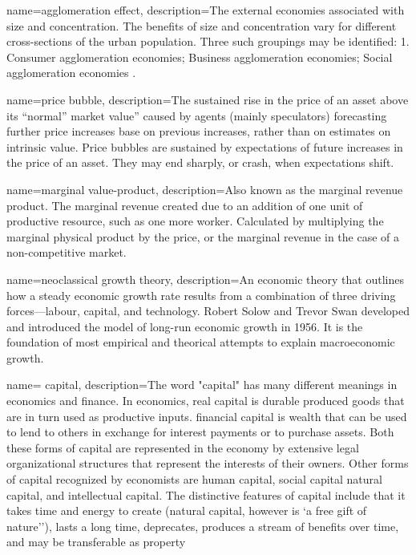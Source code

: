 {
name=agglomeration effect,
description={The external economies associated with size and concentration. The benefits of size and concentration vary for different cross-sections of the urban population. Three such groupings may be identified: 1. Consumer agglomeration economies; Business agglomeration economies; Social agglomeration economies \cite{carlinoAgglomerationEconomiesSurvey1978}.}
}

{
name=price bubble,
description={The sustained rise in the price of an asset above its ``normal'' market value'' caused by agents (mainly speculators) forecasting further price increases base on previous increases, rather than on estimates on intrinsic value.  Price bubbles are sustained by expectations of future increases in the price of an asset. They may end sharply, or crash, when expectations shift.}
}

{
name=marginal value-product,
description={Also known as the marginal revenue product. The marginal revenue created due to an addition of one unit of productive resource, such as one more worker. Calculated by multiplying the marginal physical product by the price, or the marginal revenue in the case of a non-competitive market.}
}

{
name=neoclassical growth theory,
description={An economic theory that outlines how a steady economic growth rate results from a combination of three driving forces—labour, capital, and technology. Robert Solow and Trevor Swan developed and introduced the model of long-run economic growth in 1956. It is the  foundation of most empirical and theorical attempts to explain macroeconomic growth.}
}


{
name= capital,
description={The word "capital" has many different meanings in economics and finance.  In economics, real capital is durable produced goods that are in turn used as productive inputs. \Gls{financial capital} is wealth that can be used to lend to others in exchange for interest payments or to purchase assets. Both these forms of capital are represented in the economy by extensive legal organizational structures that represent the interests of their owners. Other forms of capital recognized by economists are human capital, social capital natural capital, and intellectual capital. The distinctive  features of capital include that it takes time and energy to create (natural capital, however is  `a free gift of nature''), lasts a long time, deprecates, produces a stream of benefits over time,  and may be transferable as property}
}

